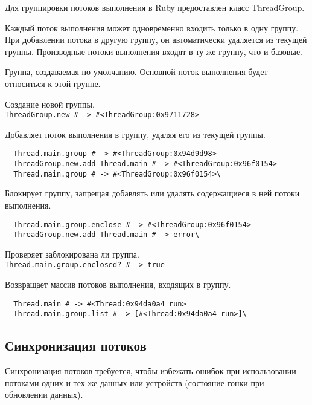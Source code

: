 Для группировки потоков выполнения в Ruby предоставлен класс ThreadGroup. 

Каждый поток выполнения может одновременно входить только в одну группу. При добавлении потока в другую группу, он автоматически удаляется из текущей группы. Производные потоки выполнения входят в ту же группу, что и базовые.

\begin{methodlist}
  Группа, создаваемая по умолчанию. Основной поток выполнения будет относиться к этой группе.

  Создание новой группы.
  \\\verb!ThreadGroup.new # -> #<ThreadGroup:0x9711728>!

  Добавляет поток выполнения в группу, удаляя его из текущей группы.
  \begin{verbatim}
  Thread.main.group # -> #<ThreadGroup:0x94d9d98>
  ThreadGroup.new.add Thread.main # -> #<ThreadGroup:0x96f0154>
  Thread.main.group # -> #<ThreadGroup:0x96f0154>\
  \end{verbatim}

  Блокирует группу, запрещая добавлять или удалять содержащиеся в ней потоки выполнения.
  \begin{verbatim}
  Thread.main.group.enclose # -> #<ThreadGroup:0x96f0154>
  ThreadGroup.new.add Thread.main # -> error\
  \end{verbatim}

  Проверяет заблокирована ли группа.
  \\\verb!Thread.main.group.enclosed? # -> true!

  Возвращает массив потоков выполнения, входящих в группу.
  \begin{verbatim}
  Thread.main # -> #<Thread:0x94da0a4 run>
  Thread.main.group.list # -> [#<Thread:0x94da0a4 run>]\
  \end{verbatim}
\end{methodlist}

\subsection{Синхронизация потоков}

Синхронизация потоков требуется, чтобы избежать ошибок при использовании потоками одних и тех же данных или устройств (состояние гонки при обновлении данных).


